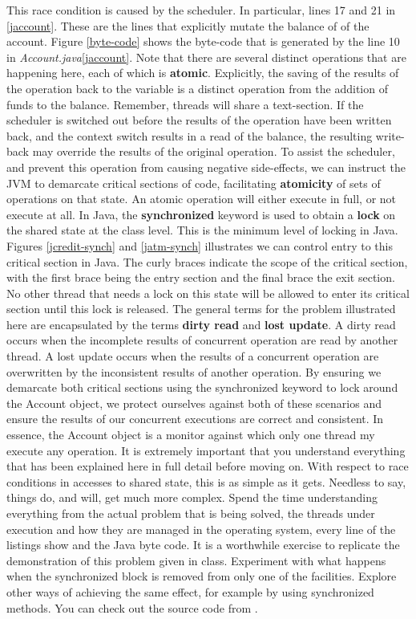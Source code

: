 \documentclass[10pt,a4paper]{article}
\begin{document}
This race condition is caused by the scheduler. In particular, lines 17 and 21 in \ref{jaccount}. These are the lines that explicitly mutate the balance of of the account. Figure \ref{byte-code} shows the byte-code that is generated by the line 10 in {\it Account.java}\ref{jaccount}. Note that there are several distinct operations that are happening here, each of which is {\bf atomic}. Explicitly, the saving of the results of the operation back to the variable is a distinct operation from the addition of funds to the balance. Remember, threads will share a text-section. If the scheduler is switched out before the results of the operation have been written back, and the context switch results in a read of the balance, the resulting write-back may override the results of the original operation. To assist the scheduler, and prevent this operation from causing negative side-effects, we can instruct the JVM to demarcate critical sections of code, facilitating {\bf atomicity} of sets of operations on that state. An atomic operation will either execute in full, or not execute at all. In Java, the {\bf synchronized} keyword is used to obtain a {\bf lock} on the shared state at the class level. This is the minimum level of locking in Java. Figures \ref{jcredit-synch} and \ref{jatm-synch} illustrates we can control entry to this critical section in Java. The curly braces indicate the scope of the critical section, with the first brace being the entry section and the final brace the exit section. No other thread that needs a lock on this state will be allowed to enter its critical section until this lock is released. The general terms for the problem illustrated here are encapsulated by the terms {\bf dirty read} and {\bf lost update}. A dirty read occurs when the incomplete results of concurrent operation are read by another thread. A lost update occurs when the results of a concurrent operation are overwritten by the inconsistent results of another operation. By ensuring we demarcate both critical sections using the synchronized keyword to lock around the Account object, we protect ourselves against both of these scenarios and ensure the results of our concurrent executions are correct and consistent. In essence, the Account object is a monitor against which only one thread my execute any operation. 
\newline\newline
It is extremely important that you understand everything that has been explained here in full detail before moving on. With respect to race conditions in accesses to shared state, this is  as simple as it gets. Needless to say, things do, and will, get much more complex. Spend the time understanding everything from the actual problem that is being solved, the threads under execution and how they are managed in the operating system, every line of the listings show and the Java byte code. It is a worthwhile exercise to replicate the demonstration of this problem given in class. Experiment with what happens when the synchronized block is removed from only one of the facilities. Explore other ways of achieving the same effect, for example by using synchronized methods. You can check out the source code from \cite{github-public}.
\end{document}

